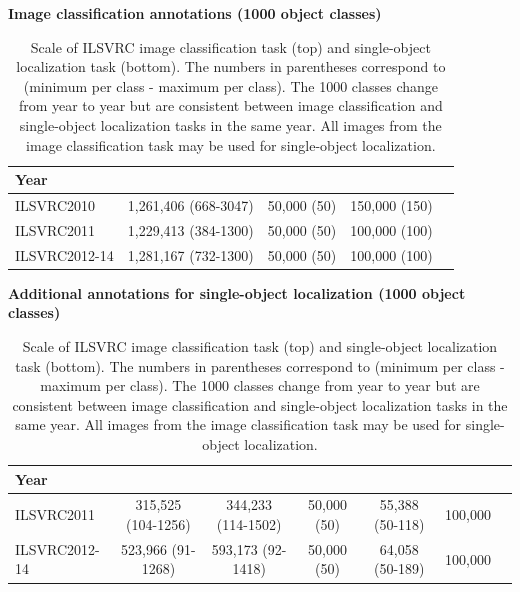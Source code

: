 \begin{table}

\begin{center} {\bf Image classification annotations (1000 object classes)} \end{center}

\begin{tabular}{|p{0.9in}|c|c|c|c|}
\hline
Year
&
\parbox[t]{2.3in}{}
&
\parbox[t]{1.95in}{}
&
\parbox[t]{1.25in}{}
\\
\hline
ILSVRC2010 
&
1,261,406  (668-3047)
&
50,000  (50)
&
150,000  (150)
\\
\hline
ILSVRC2011
&
1,229,413 (384-1300)
&
50,000  (50)
&
100,000  (100)
\\
\hline
ILSVRC2012-14 
&
1,281,167  (732-1300)
&
 50,000  (50)
&
 100,000  (100)
\\
\hline
\end{tabular}


\begin{center}
{\bf Additional annotations for single-object localization (1000 object classes)}
\end{center}

\begin{tabular}{|p{0.9in}|c|c|c|c|c|c|}
\hline
Year
&
\parbox[t]{1.1in}{}
&
\parbox[t]{1in}{}
&
\parbox[t]{0.95in}{}
&
\parbox[t]{0.8in}{}
&
\parbox[t]{1.25in}{}
\\
\hline
ILSVRC2011
& 315,525 (104-1256)
& 344,233 (114-1502)
& 50,000 (50)
& 55,388 (50-118)
& 100,000
\\
\hline
ILSVRC2012-14 
& 523,966 (91-1268)
& 593,173 (92-1418)
& 50,000 (50)
& 64,058 (50-189)
& 100,000
\\
\hline
\end{tabular}

\caption{Scale of ILSVRC image classification task (top) and single-object localization task (bottom). The numbers in parentheses correspond to (minimum per class - maximum per class). The 1000 classes change from year to year but are consistent between image classification and single-object localization tasks in the same year. All images from the image classification task may be used
for single-object localization.}
\label{table:clslocstats}
\end{table}

